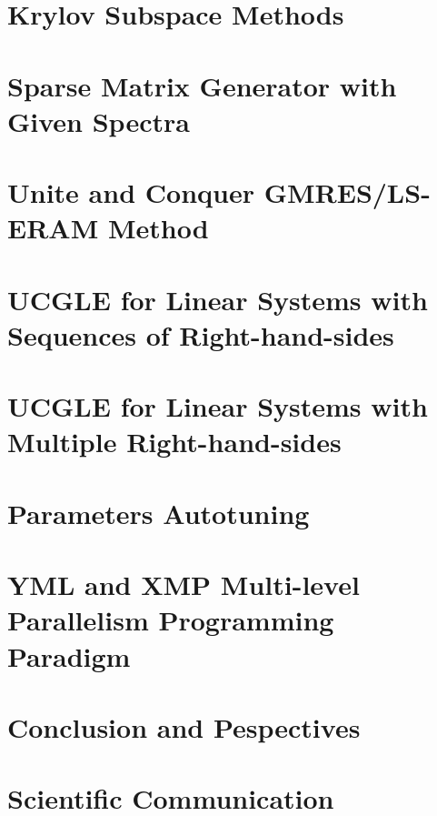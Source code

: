 \documentclass{xinzhewu}
\begin{document}


\chapter{Krylov Subspace Methods}



\chapter{Sparse Matrix Generator with Given Spectra}



\chapter[Unite and Conquer GMRES/LS-ERAM Method]{Unite and Conquer GMRES/LS-ERAM Method}



\chapter{UCGLE for Linear Systems with Sequences of Right-hand-sides}



\chapter{UCGLE for Linear Systems with Multiple Right-hand-sides}



\chapter{Parameters Autotuning}



\chapter{YML and XMP Multi-level Parallelism Programming Paradigm}



\chapter*{Conclusion and Pespectives}



\chapter*{Scientific Communication}




\clearemptydoublepage
\end{document}
